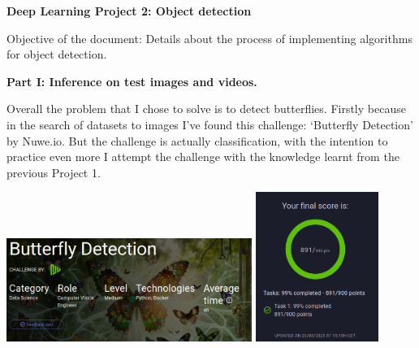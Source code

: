 \documentclass{cpsc202}
\begin{document}
    \centerline{\Large\textbf{Deep Learning Project 2: Object detection}}

    Objective of the document: Details about the process of implementing algorithms for object detection.

    \large\textbf{Part I: Inference on test images and videos.}

    Overall the problem that I chose to solve is to detect butterflies.
    Firstly because in the search of datasets to images I've found this challenge: `Butterfly Detection' by Nuwe.io.
    But the challenge is actually classification, with the intention to practice even more I attempt the challenge with the knowledge learnt from the previous Project 1.
    \begin{center}
        \includegraphics[width=0.6\textwidth]{challenge_butterfly_classification}
        \includegraphics[width=0.3\textwidth]{challenge_result}
    \end{center}
\end{document}
